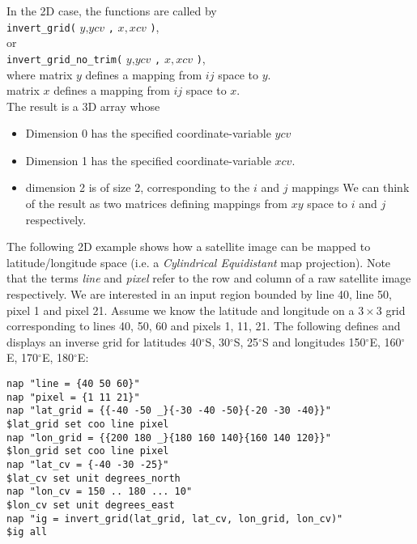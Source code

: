   \par In the 2D case, the functions are called by
  \\
  \texttt{invert\_grid(} 
  $y 
  \texttt{,}ycv$ 
  \texttt{,} 
  $x,xcv$ 
  \texttt{)},
  \\or
  \\
  \texttt{invert\_grid\_no\_trim(} 
  $y 
  \texttt{,}ycv$ 
  \texttt{,} 
  $x,xcv$ 
  \texttt{)},
  \\where matrix 
  $y$ defines a mapping from 
  $ij$ space to 
  $y$.
  \\matrix 
  $x$ defines a mapping from 
  $ij$ space to 
  $x$.
  \\The result is a 3D array whose
  \begin{itemize}
    \item Dimension 0 has the specified coordinate-variable 
    $ycv$
    \item Dimension 1 has the specified coordinate-variable 
    $xcv$.
    \\
    \item dimension 2 is of size 2, corresponding to the 
    $i$ and 
    $j$ mappings We can think of the result as two matrices
    defining mappings from 
    $xy$ space to 
    $i$ and 
    $j$ respectively.
  \end{itemize}
  \par The following 2D example shows how a satellite image can be mapped
  to latitude/longitude space (i.e. a 
  \textit{Cylindrical Equidistant} map projection). Note that the terms
  \textit{line} and 
  \textit{pixel} refer to the row and column of a raw satellite image
  respectively. We are interested in an input region bounded by line
  40, line 50, pixel 1 and pixel 21. Assume we know the latitude and
  longitude on a $3\times 3$ grid corresponding to lines 40, 50, 60 and pixels
  1, 11, 21. The following defines and displays an inverse grid for
  latitudes 40$^{\circ}$S, 30$^{\circ}$S, 25$^{\circ}$S and longitudes 150$^{\circ}$E, 160$^{\circ}$E, 170$^{\circ}$E,
  180$^{\circ}$E:
  \begin{verbatim}
nap "line = {40 50 60}"
nap "pixel = {1 11 21}"
nap "lat_grid = {{-40 -50 _}{-30 -40 -50}{-20 -30 -40}}"
$lat_grid set coo line pixel
nap "lon_grid = {{200 180 _}{180 160 140}{160 140 120}}"
$lon_grid set coo line pixel
nap "lat_cv = {-40 -30 -25}"
$lat_cv set unit degrees_north
nap "lon_cv = 150 .. 180 ... 10"
$lon_cv set unit degrees_east
nap "ig = invert_grid(lat_grid, lat_cv, lon_grid, lon_cv)"
$ig all
\end{verbatim}

